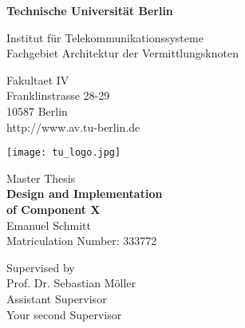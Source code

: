 \thispagestyle{empty}
\begin{center}

\vspace*{1.4cm}
{\LARGE \textbf{Technische Universit{\"a}t Berlin}}

\vspace{0.5cm}

{\large Institut für Telekommunikationssysteme\\[1mm]}
{\large Fachgebiet Architektur der Vermittlungsknoten\\[5mm]}

Fakultaet IV\\
Franklinstrasse 28-29\\
10587 Berlin\\
http://www.av.tu-berlin.de\\

\vspace*{1cm}

\texttt{[image: tu\_logo.jpg]}

\vspace*{1.0cm}

{\LARGE Master Thesis}\\

\vspace{1.0cm}
{\LARGE \textbf{Design and Implementation}}\\
\vspace*{0.3cm}
{\LARGE \textbf{of Component X}}\\
\vspace*{1.0cm}
{\LARGE Emanuel Schmitt}
\\
\vspace*{0.5cm}
Matriculation Number: 333772\\
\vspace*{1.0cm}

Supervised by\\
Prof. Dr. Sebastian M{\"o}ller\\
\vspace*{0.5cm}
Assistant Supervisor\\
Your second Supervisor
\vspace{3cm}


\end{center}

